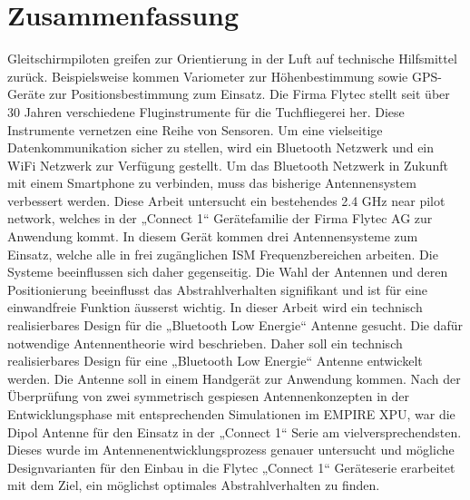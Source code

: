 \section*{Zusammenfassung}

Gleitschirmpiloten greifen zur Orientierung in der Luft auf technische Hilfsmittel zurück. Beispielsweise kommen Variometer zur Höhenbestimmung sowie GPS-Geräte zur Positionsbestimmung zum Einsatz. Die Firma Flytec stellt seit über 30 Jahren verschiedene Fluginstrumente für die Tuchfliegerei her. Diese Instrumente vernetzen eine Reihe von Sensoren. Um eine vielseitige Datenkommunikation sicher zu stellen, wird ein Bluetooth Netzwerk und ein WiFi Netzwerk zur Verfügung gestellt. Um das Bluetooth Netzwerk in Zukunft mit einem Smartphone zu verbinden, muss das bisherige Antennensystem verbessert werden.
Diese Arbeit untersucht ein bestehendes 2.4 GHz \glqq near pilot network\grqq , welches in der „Connect 1“ Gerätefamilie der Firma Flytec AG zur Anwendung kommt. In diesem  Gerät kommen drei Antennensysteme zum Einsatz, welche alle in frei zugänglichen ISM Frequenzbereichen arbeiten. Die Systeme beeinflussen sich daher gegenseitig. Die Wahl der Antennen und deren Positionierung beeinflusst das Abstrahlverhalten signifikant und ist für eine einwandfreie Funktion äusserst wichtig. In dieser Arbeit wird ein technisch realisierbares Design für die „Bluetooth Low Energie“ Antenne gesucht. Die dafür notwendige Antennentheorie wird beschrieben. Daher soll ein technisch realisierbares Design für eine „Bluetooth Low Energie“ Antenne entwickelt werden. Die Antenne soll in einem Handgerät zur Anwendung kommen. Nach der Überprüfung von zwei symmetrisch gespiesen Antennenkonzepten in der Entwicklungsphase mit entsprechenden Simulationen im EMPIRE XPU, war die Dipol Antenne für den Einsatz in der „Connect 1“ Serie am vielversprechendsten. Dieses wurde im Antennenentwicklungsprozess genauer untersucht und mögliche Designvarianten für den Einbau in die Flytec „Connect 1“ Geräteserie erarbeitet mit dem Ziel, ein möglichst optimales Abstrahlverhalten zu finden.

